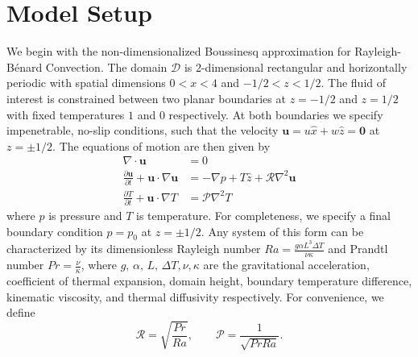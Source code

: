\documentclass[reprint,amsmath,amssymb,aps]{revtex4-1}
\begin{document}
\section{Model Setup}\label{sec:model}
We begin with the non-dimensionalized Boussinesq approximation for Rayleigh-Bénard Convection. 
The domain $\mathcal{D}$ is 2-dimensional rectangular and horizontally periodic with spatial dimensions $0 < x < 4$ and $-1/2 < z < 1/2$. 
The fluid of interest is constrained between two planar boundaries at $z = -1/2$ and $z = 1/2$ with fixed temperatures $1$ and $0$ respectively. 
At both boundaries we specify impenetrable, no-slip conditions, such that the velocity $\mathbf{u} = u \hat{x} + w \hat{z} = \mathbf{0}$ at $z = \pm 1/2$. 
The equations of motion are then given by
\begin{align}
    \nabla \cdot \mathbf{u} &= 0 \label{EQ:motion1}\\
    \frac{\partial \mathbf{u}}{\partial t} + \mathbf{u} \cdot \nabla \mathbf{u} &= - \nabla p + T \hat{z} + \mathcal{R} \nabla^2 \mathbf{u} \label{EQ:motion2}\\
    \frac{\partial T}{\partial t} + \mathbf{u} \cdot \nabla T &= \mathcal{P} \nabla^2 T \label{EQ:motion3}
\end{align}
where $p$ is pressure and $T$ is temperature. 
For completeness, we specify a final boundary condition $p = p_0$ at $z = \pm 1/2$. 
Any system of this form can be characterized by its dimensionless Rayleigh number $Ra = \frac{g\alpha L^3 \Delta T}{\nu \kappa}$ and Prandtl number $Pr = \frac{\nu}{\kappa}$, where $g, \, \alpha, \, L, \, \Delta T, \nu, \kappa$ are the gravitational acceleration, coefficient of thermal expansion, domain height, boundary temperature difference, kinematic viscosity, and thermal diffusivity respectively. For convenience, we define
\begin{equation}
\mathcal{R} = \sqrt{\frac{Pr}{Ra}}, \qquad \mathcal{P} = \frac{1}{\sqrt{Pr Ra}}.
\end{equation}
\end{document}
